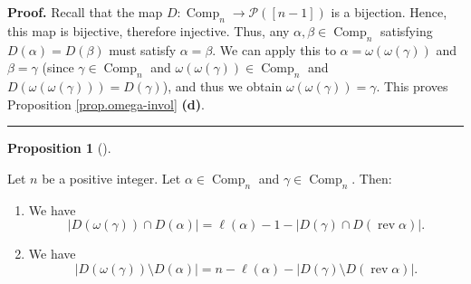 \documentclass[numbers=enddot,12pt,final,onecolumn,notitlepage]{scrartcl}%
\theoremstyle{definition}
\newtheorem{prop}[theo]{Proposition}
\newenvironment{proposition}[1][]
{\begin{prop}[#1]\begin{leftbar}}
{\end{leftbar}\end{prop}}
\newenvironment{proof}[1][Proof]{\noindent\textbf{#1.} }{\ \rule{0.5em}{0.5em}}
\begin{document}
\begin{proof}
Recall that the map $D:\operatorname*{Comp}\nolimits_{n}\rightarrow
\mathcal{P}\left(  \left[  n-1\right]  \right)  $ is a bijection. Hence, this
map is bijective, therefore injective. Thus, any $\alpha,\beta\in
\operatorname*{Comp}\nolimits_{n}$ satisfying $D\left(  \alpha\right)
=D\left(  \beta\right)  $ must satisfy $\alpha=\beta$. We can apply this to
$\alpha=\omega\left(  \omega\left(  \gamma\right)  \right)  $ and
$\beta=\gamma$ (since $\gamma\in\operatorname*{Comp}\nolimits_{n}$ and
$\omega\left(  \omega\left(  \gamma\right)  \right)  \in\operatorname*{Comp}%
\nolimits_{n}$ and $D\left(  \omega\left(  \omega\left(  \gamma\right)
\right)  \right)  =D\left(  \gamma\right)  $), and thus we obtain
$\omega\left(  \omega\left(  \gamma\right)  \right)  =\gamma$. This proves
Proposition \ref{prop.omega-invol} \textbf{(d)}.
\end{proof}

\begin{proposition}
\label{prop.omega-obs1}Let $n$ be a positive integer. Let $\alpha
\in\operatorname*{Comp}\nolimits_{n}$ and $\gamma\in\operatorname*{Comp}%
\nolimits_{n}$. Then:

\begin{enumerate}
\item[\textbf{(a)}] We have
\[
\left\vert D\left(  \omega\left(  \gamma\right)  \right)  \cap D\left(
\alpha\right)  \right\vert =\ell\left(  \alpha\right)  -1-\left\vert D\left(
\gamma\right)  \cap D\left(  \operatorname*{rev}\alpha\right)  \right\vert .
\]


\item[\textbf{(b)}] We have
\[
\left\vert D\left(  \omega\left(  \gamma\right)  \right)  \setminus D\left(
\alpha\right)  \right\vert =n-\ell\left(  \alpha\right)  -\left\vert D\left(
\gamma\right)  \setminus D\left(  \operatorname*{rev}\alpha\right)
\right\vert .
\]

\end{enumerate}
\end{proposition}
\end{document}
